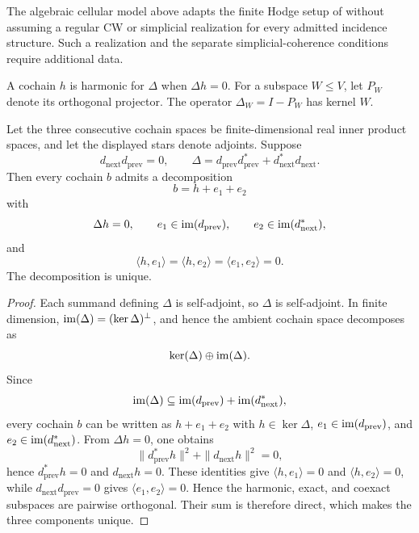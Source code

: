 The algebraic cellular model above adapts the finite Hodge setup of
\cite{hansenGhrist2018sheaves} without assuming a regular CW or simplicial
realization for every admitted incidence structure. Such a realization and
the separate simplicial-coherence conditions require additional data.

\begin{definition}
\label{def:matrix-harmonicity}\label{def:projection-laplacian}
  A cochain \(h\) is harmonic for \(\Delta\) when \(\Delta h=0\).
  For a subspace \(W\le V\), let \(P_W\) denote its orthogonal projector.
  The operator \(\Delta_W=I-P_W\) has kernel \(W\).
\end{definition}

\begin{proposition}\label{prop:hodge-decomposition}
  Let the three consecutive cochain spaces be finite-dimensional real inner
  product spaces, and let the displayed stars denote adjoints. Suppose
  \[
    d_{\mathrm{next}}d_{\mathrm{prev}}=0,
    \qquad
    \Delta=d_{\mathrm{prev}}d_{\mathrm{prev}}^\ast
      +d_{\mathrm{next}}^\ast d_{\mathrm{next}} .
  \]
  Then every cochain \(b\) admits a decomposition
  \[
    b=h+e_1+e_2
  \]
  with
  \[
    \Delta h=0,\qquad
    e_1\in\operatorname{im}(d_{\mathrm{prev}}),\qquad
    e_2\in\operatorname{im}(d_{\mathrm{next}}^\ast),
  \]
  and
  \[
    \langle h,e_1\rangle=\langle h,e_2\rangle=\langle e_1,e_2\rangle=0.
  \]
  The decomposition is unique.
\end{proposition}

\begin{proof}
  Each summand defining \(\Delta\) is self-adjoint, so \(\Delta\) is
  self-adjoint. In finite dimension,
  \(\operatorname{im}(\Delta)=(\ker\Delta)^\perp\), and hence the ambient cochain
  space decomposes as
  \[
    \ker(\Delta)\oplus\operatorname{im}(\Delta).
  \]
  Since
  \[
    \operatorname{im}(\Delta)
    \subseteq
    \operatorname{im}(d_{\mathrm{prev}})+\operatorname{im}(d_{\mathrm{next}}^\ast),
  \]
  every cochain \(b\) can be written as \(h+e_1+e_2\) with \(h\in\ker\Delta\),
  \(e_1\in\operatorname{im}(d_{\mathrm{prev}})\), and
  \(e_2\in\operatorname{im}(d_{\mathrm{next}}^\ast)\). From \(\Delta h=0\), one obtains
  \[
    \|d_{\mathrm{prev}}^\ast h\|^2+\|d_{\mathrm{next}}h\|^2=0,
  \]
  hence \(d_{\mathrm{prev}}^\ast h=0\) and \(d_{\mathrm{next}}h=0\). These
  identities give \(\langle h,e_1\rangle=0\) and
  \(\langle h,e_2\rangle=0\), while \(d_{\mathrm{next}}d_{\mathrm{prev}}=0\)
  gives \(\langle e_1,e_2\rangle=0\). Hence the harmonic, exact, and
  coexact subspaces are pairwise orthogonal. Their sum is therefore direct,
  which makes the three components unique.
\end{proof}

